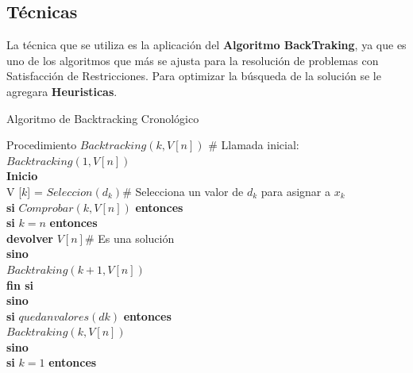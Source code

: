 \documentclass[a4paper]{article}
\begin{document}
\subsection{Técnicas}
La técnica que se utiliza es la aplicación del \textbf{Algoritmo BackTraking}, ya que es uno de los algoritmos que más se ajusta para la resolución de problemas con Satisfacción de Restricciones.
Para optimizar la búsqueda de la solución se le agregara \textbf{Heuristicas}.
\bigskip

\begin{algorithm}
	\caption{Algoritmo de Backtracking Cronológico\label{ALG1_3}}
	Procedimiento $Backtracking(k, V [n])$ \# Llamada inicial: $Backtracking(1, V [n])$ \\
	\hspace{0.1cm} \textbf{Inicio}\\
	\hspace{0.1cm} V [$k$] = $Seleccion(d_k)$\hspace{1cm}\# Selecciona un valor de $d_k$ para asignar a $x_k$ \\
	\hspace{0.1cm} \textbf{si} $Comprobar(k, V [n])$ \textbf{entonces}\\
	\hspace{0.6cm} \textbf{si} $k = n$ \textbf{entonces}\\
	\hspace{1.1cm} \textbf{devolver} $V [n]$\hspace{1cm}\# Es una solución\\
	\hspace{0.6cm} \textbf{sino}\\
	\hspace{1.1cm} $Backtraking(k + 1, V [n])$\\
	\hspace{0.6cm} \textbf{fin si}\\
	\hspace{0.1cm} \textbf{sino}\\
	\hspace{0.6cm} \textbf{si} $quedan valores(dk)$ \textbf{entonces}\\
	\hspace{1.1cm} $Backtraking(k, V [n])$\\
	\hspace{0.6cm} \textbf{sino}\\
	\hspace{1.1cm} \textbf{si} $k = 1$ \textbf{entonces}\\

\end{algorithm}
\end{document}
